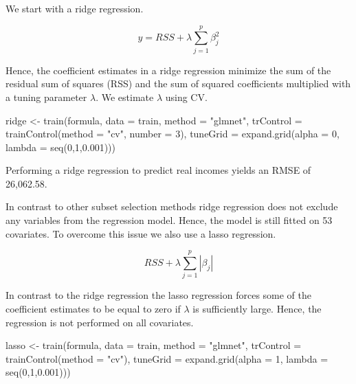 \documentclass[11pt,a4paper]{article}
\newenvironment{Shaded}{\begin{snugshade}}{\end{snugshade}}
\newcommand{\AttributeTok}[1]{\textcolor[rgb]{0.77,0.63,0.00}{#1}}
\newcommand{\DecValTok}[1]{\textcolor[rgb]{0.00,0.00,0.81}{#1}}
\newcommand{\FloatTok}[1]{\textcolor[rgb]{0.00,0.00,0.81}{#1}}
\newcommand{\FunctionTok}[1]{\textcolor[rgb]{0.00,0.00,0.00}{#1}}
\newcommand{\NormalTok}[1]{#1}
\newcommand{\OtherTok}[1]{\textcolor[rgb]{0.56,0.35,0.01}{#1}}
\newcommand{\StringTok}[1]{\textcolor[rgb]{0.31,0.60,0.02}{#1}}
\begin{document}
We start with a ridge regression.

\[
y = RSS + \lambda \sum^p _{j=1} \beta^2_j 
\]

Hence, the coefficient estimates in a ridge regression minimize the sum
of the residual sum of squares (RSS) and the sum of squared coefficients
multiplied with a tuning parameter \(\lambda\). We estimate \(\lambda\)
using CV.

\begin{Shaded}
\begin{Highlighting}[]
\NormalTok{ridge }\OtherTok{\textless{}{-}} \FunctionTok{train}\NormalTok{(formula, }\AttributeTok{data =}\NormalTok{ train,}
  \AttributeTok{method =} \StringTok{"glmnet"}\NormalTok{, }\AttributeTok{trControl =} \FunctionTok{trainControl}\NormalTok{(}\AttributeTok{method =} \StringTok{"cv"}\NormalTok{, }\AttributeTok{number =} \DecValTok{3}\NormalTok{),}
  \AttributeTok{tuneGrid =} \FunctionTok{expand.grid}\NormalTok{(}\AttributeTok{alpha =} \DecValTok{0}\NormalTok{, }\AttributeTok{lambda =} \FunctionTok{seq}\NormalTok{(}\DecValTok{0}\NormalTok{,}\DecValTok{1}\NormalTok{,}\FloatTok{0.001}\NormalTok{)))}
\end{Highlighting}
\end{Shaded}

Performing a ridge regression to predict real incomes yields an RMSE of
26,062.58.

In contrast to other subset selection methods ridge regression does not
exclude any variables from the regression model. Hence, the model is
still fitted on 53 covariates. To overcome this issue we also use a
lasso regression.

\[
RSS + \lambda \sum^p_{j=1} | \beta_j |
\]

In contrast to the ridge regression the lasso regression forces some of
the coefficient estimates to be equal to zero if \(\lambda\) is
sufficiently large. Hence, the regression is not performed on all
covariates.

\begin{Shaded}
\begin{Highlighting}[]
\NormalTok{lasso }\OtherTok{\textless{}{-}} \FunctionTok{train}\NormalTok{(formula, }\AttributeTok{data =}\NormalTok{ train, }
       \AttributeTok{method =} \StringTok{"glmnet"}\NormalTok{, }\AttributeTok{trControl =} \FunctionTok{trainControl}\NormalTok{(}\AttributeTok{method =} \StringTok{"cv"}\NormalTok{), }
       \AttributeTok{tuneGrid =} \FunctionTok{expand.grid}\NormalTok{(}\AttributeTok{alpha =} \DecValTok{1}\NormalTok{, }\AttributeTok{lambda =} \FunctionTok{seq}\NormalTok{(}\DecValTok{0}\NormalTok{,}\DecValTok{1}\NormalTok{,}\FloatTok{0.001}\NormalTok{)))}
\end{Highlighting}
\end{Shaded}
\end{document}
